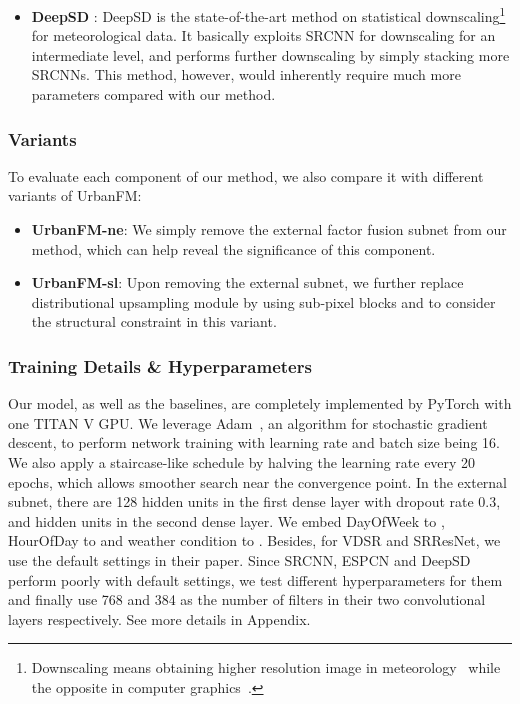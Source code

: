 \begin{itemize}[leftmargin=*]
\item \textbf{DeepSD} \cite{vandal2017deepsd}: DeepSD is the state-of-the-art method on statistical downscaling\footnote{Downscaling means obtaining higher resolution image in meteorology~\cite{vandal2017deepsd} while the opposite in computer graphics~\cite{dong2016srcnn}.} for meteorological data. It basically exploits SRCNN for downscaling for an intermediate level, and performs further downscaling by simply stacking more SRCNNs. This method, however, would inherently require much more parameters compared with our method.
\end{itemize}

\subsubsection{Variants}
To evaluate each component of our method, we also compare it with different variants of UrbanFM:
\begin{itemize}[leftmargin=*]
	\item \textbf{UrbanFM-ne}: We simply remove the external factor fusion subnet from our method, which can help reveal the significance of this component.
	\item \textbf{UrbanFM-sl}: Upon removing the external subnet, we further replace distributional upsampling module by using sub-pixel blocks and  to consider the structural constraint in this variant. 
	\end{itemize}

\subsubsection{Training Details \& Hyperparameters}

Our model, as well as the baselines, are completely implemented by PyTorch  with one TITAN V GPU. We leverage Adam~\cite{kingma2014adam}, an algorithm for stochastic gradient descent, to perform network training with learning rate  and batch size being 16. We also apply a staircase-like schedule by halving the learning rate every 20 epochs, which allows smoother search near the convergence point. In the external subnet, there are 128 hidden units in the first dense layer with dropout rate 0.3, and  hidden units in the second dense layer. We embed DayOfWeek to , HourOfDay to  and weather condition to . Besides, for VDSR and SRResNet, we use the default settings in their paper. Since SRCNN, ESPCN and DeepSD perform poorly with default settings, we test different hyperparameters for them and finally use 768 and 384 as the number of filters in their two convolutional layers respectively. See more details in Appendix.

